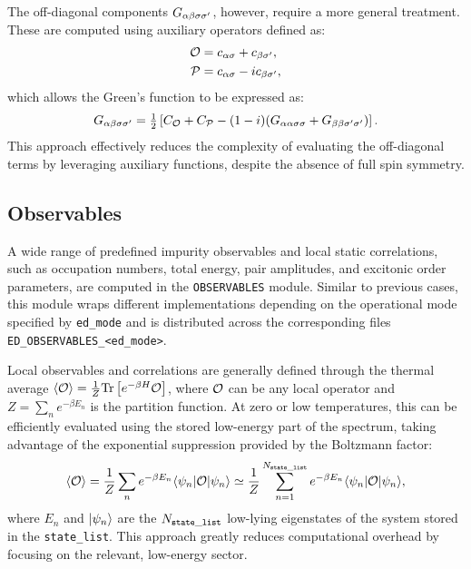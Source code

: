\documentclass[edipack_sp.tex]{subfiles}
\begin{document}
The off-diagonal components $G_{\alpha\beta\sigma\sigma'}$, however, 
require a more general treatment. These are computed using 
auxiliary operators defined as:
\begin{align*}
{\cal O} &= c_{\alpha\sigma} + c_{\beta\sigma'}, \\
{\cal P} &= c_{\alpha\sigma} - i c_{\beta\sigma'},
\end{align*}
which allows the Green's function to be expressed as:
\begin{equation}
G_{\alpha\beta\sigma\sigma'} = \tfrac{1}{2} \left[ C_{\cal O} + C_{\cal P} - 
(1-i)(G_{\alpha\alpha\sigma\sigma} + G_{\beta\beta\sigma'\sigma'}) \right].
\end{equation}
This approach effectively reduces the complexity of 
evaluating the off-diagonal terms by leveraging auxiliary 
functions, despite the absence of full spin symmetry.





\subsection{Observables}\label{sSecObc}
A wide range of predefined impurity observables and local 
static correlations, such as occupation numbers, total 
energy, pair amplitudes, and excitonic order parameters, 
are computed in the \texttt{OBSERVABLES} module. Similar to 
previous cases, this module wraps different implementations 
depending on the operational mode specified by 
{\tt ed\_mode} and is distributed across the corresponding 
files {\tt ED\_OBSERVABLES\_<ed\_mode>}. 



Local observables and correlations are generally defined 
through the thermal average 
$\langle {\cal O}\rangle = \tfrac{1}{Z}{\rm Tr}\left[e^{-\beta H}{\cal O}\right]$, 
where ${\cal O}$ can be any local operator and  $Z = \sum_n e^{-\beta E_n}$ is the partition function. 
At zero or low temperatures, this can be efficiently 
evaluated using the stored low-energy part of the spectrum, 
taking advantage of the exponential suppression provided by 
the Boltzmann factor:
\begin{equation}
\langle {\cal O}\rangle = \frac{1}{Z}\sum_n e^{-\beta E_n}
\langle \psi_n| {\cal O} |\psi_n\rangle\simeq \frac{1}{Z}\sum_{n=1}^{N_{\tt state\_list}} e^{-\beta E_n}
\langle \psi_n| {\cal O} |\psi_n\rangle,
\label{eq:thermal_average}
\end{equation}
where $E_n$ and $|\psi_n\rangle$ are the $N_{\tt state\_list}$ low-lying eigenstates 
of the system stored in the {\tt state\_list}. This approach 
greatly reduces computational overhead by focusing on the 
relevant, low-energy sector.
\end{document}
